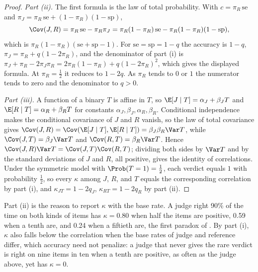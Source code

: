 \begin{refsection}
\begin{proof}
\emph{Part (ii).} The first formula is the law of total probability. With $c=\pi_R\,\mathrm{se}$ and $\pi_J=\pi_R\,\mathrm{se}+(1-\pi_R)(1-\mathrm{sp})$,
\[
\Cov(J,R)=\pi_R\,\mathrm{se}-\pi_R\pi_J=\pi_R(1-\pi_R)\,\mathrm{se}-\pi_R(1-\pi_R)(1-\mathrm{sp}),
\]
which is $\pi_R(1-\pi_R)(\mathrm{se}+\mathrm{sp}-1)$. For $\mathrm{se}=\mathrm{sp}=1-q$ the accuracy is $1-q$, $\pi_J=\pi_R+q(1-2\pi_R)$, and the denominator of part (i) is $\pi_J+\pi_R-2\pi_J\pi_R=2\pi_R(1-\pi_R)+q(1-2\pi_R)^2$, which gives the displayed formula. At $\pi_R=\frac12$ it reduces to $1-2q$. As $\pi_R$ tends to $0$ or $1$ the numerator tends to zero and the denominator to $q>0$.

\emph{Part (iii).} A function of a binary $T$ is affine in $T$, so $\E[J\mid T]=\alpha_J+\beta_JT$ and $\E[R\mid T]=\alpha_R+\beta_RT$ for constants $\alpha_J,\beta_J,\alpha_R,\beta_R$. Conditional independence makes the conditional covariance of $J$ and $R$ vanish, so the law of total covariance gives $\Cov(J,R)=\Cov(\E[J\mid T],\E[R\mid T])=\beta_J\beta_R\Var T$, while $\Cov(J,T)=\beta_J\Var T$ and $\Cov(R,T)=\beta_R\Var T$. Hence $\Cov(J,R)\Var T=\Cov(J,T)\Cov(R,T)$; dividing both sides by $\Var T$ and by the standard deviations of $J$ and $R$, all positive, gives the identity of correlations. Under the symmetric model with $\Prob(T=1)=\frac12$, each verdict equals $1$ with probability $\frac12$, so every $\kappa$ among $J$, $R$, and $T$ equals the corresponding correlation by part (i), and $\kappa_{JT}=1-2q_J$, $\kappa_{RT}=1-2q_R$ by part (ii).
\end{proof}

Part (ii) is the reason to report $\kappa$ with the base rate. A judge right 90\% of the time on both kinds of items has $\kappa=0.80$ when half the items are positive, 0.59 when a tenth are, and 0.24 when a fiftieth are, the first paradox of \textcite{FeinsteinCicchetti1990}. By part (i), $\kappa$ also falls below the correlation when the base rates of judge and reference differ, which accuracy need not penalize: a judge that never gives the rare verdict is right on nine items in ten when a tenth are positive, as often as the judge above, yet has $\kappa=0$.


\end{refsection}

